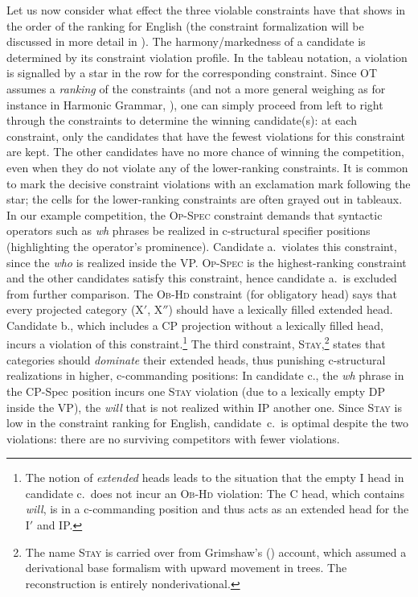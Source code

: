 \documentclass[output=paper,hidelinks]{langscibook}
\begin{document}
Let us now consider what effect the three violable constraints have that  shows in the order of the ranking for English
(the constraint formalization will be discussed in more detail in ). The harmony/markedness of a candidate is determined by its constraint violation profile.
In the tableau notation, a violation is signalled by a star in the row for the corresponding constraint. Since OT assumes a \emph{ranking} of the constraints (and not a more general weighing as for instance in Harmonic Grammar, \citealt{Legendre-etal-1990}), one can simply proceed from left to right through the constraints to determine the winning candidate(s): at each constraint, only the candidates that have the fewest violations for this constraint are kept. The other candidates have no more chance of winning the competition, even when they do not violate any of the lower-ranking constraints.  It is common to mark the decisive constraint violations with an exclamation mark following the star; the cells for the lower-ranking constraints are often grayed out in tableaux. 
In our example competition, the \textsc{Op-Spec} constraint demands that syntactic operators such as \emph{wh} phrases be realized in c-structural specifier positions (highlighting the operator's prominence). Candidate a.\ violates this constraint, since the \emph{who} is realized inside the VP. \textsc{Op-Spec} is the highest-ranking constraint and the other candidates satisfy this constraint, hence candidate a.\ is excluded from further comparison. The \textsc{Ob-Hd} constraint (for obligatory head) says that every projected category (X$'$, X$''$) should have a lexically filled extended head. Candidate b., which includes a CP projection without a lexically filled head, incurs a violation of this constraint.\footnote{The notion of \emph{extended} heads leads to the situation that the empty I head in candidate c.\ does not incur an \textsc{Ob-Hd} violation: The C head, which contains \emph{will}, is in a c-commanding position and thus acts as an extended head for the I$'$ and IP.} The third constraint,  \textsc{Stay},\footnote{The name \textsc{Stay} is carried over from Grimshaw's (\citeyear{Grimshaw97}) account, which assumed a derivational base formalism with upward movement in trees. The reconstruction is entirely nonderivational.} states that categories should \emph{dominate} their extended heads, thus punishing c-structural realizations in higher, c-commanding positions: In candidate c., the \emph{wh} phrase in the CP-Spec position incurs one \textsc{Stay} violation (due to a lexically empty DP inside the VP), the \emph{will} that is not realized within IP another one. Since \textsc{Stay} is low in the constraint ranking for English, candidate~c.~is optimal despite the two violations: there are no surviving competitors with fewer violations.
\end{document}
